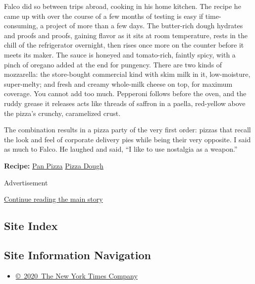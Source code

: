 Falco did so between trips abroad, cooking in his home kitchen. The
recipe he came up with over the course of a few months of testing is
easy if time-consuming, a project of more than a few days. The
butter-rich dough hydrates and proofs and proofs, gaining flavor as it
sits at room temperature, rests in the chill of the refrigerator
overnight, then rises once more on the counter before it meets its
maker. The sauce is honeyed and tomato-rich, faintly spicy, with a pinch
of oregano added at the end for pungency. There are two kinds of
mozzarella: the store-bought commercial kind with skim milk in it,
low-moisture, super-melty; and fresh and creamy whole-milk cheese on
top, for maximum coverage. You cannot add too much. Pepperoni follows
before the oven, and the ruddy grease it releases acts like threads of
saffron in a paella, red-yellow above the pizza's crunchy, caramelized
crust.

The combination results in a pizza party of the very first order: pizzas
that recall the look and feel of corporate delivery pies while being
their very opposite. I said as much to Falco. He laughed and said, ``I
like to use nostalgia as a weapon.''

\textbf{Recipe:}
\href{https://cooking.nytimes3xbfgragh.onion/recipes/1019335-pan-pizza}{Pan
Pizza} \textbar{}
\href{https://cooking.nytimes3xbfgragh.onion/recipes/1019336-pizza-dough}{Pizza
Dough}

Advertisement

\protect\hyperlink{after-bottom}{Continue reading the main story}

\hypertarget{site-index}{%
\subsection{Site Index}\label{site-index}}

\hypertarget{site-information-navigation}{%
\subsection{Site Information
Navigation}\label{site-information-navigation}}

\begin{itemize}
\tightlist
\item
  \href{https://help.nytimes3xbfgragh.onion/hc/en-us/articles/115014792127-Copyright-notice}{©~2020~The
  New York Times Company}
\end{itemize}

